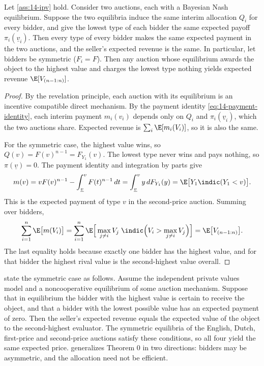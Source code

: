 \begin{proposition}\label{prop:14-ret}
Let \cref{ass:14-ipv} hold. Consider two auctions, each with a Bayesian Nash equilibrium. Suppose the two equilibria induce the same interim allocation $Q_i$ for every bidder, and give the lowest type of each bidder the same expected payoff $\pi_i(\underline v_i)$. Then every type of every bidder makes the same expected payment in the two auctions, and the seller's expected revenue is the same. In particular, let bidders be symmetric ($F_i=F$). Then any auction whose equilibrium awards the object to the highest value and charges the lowest type nothing yields expected revenue $\E[V_{(n-1:n)}]$.
\end{proposition}

\begin{proof}
By the revelation principle, each auction with its equilibrium is an incentive compatible direct mechanism. By the payment identity \eqref{eq:14-payment-identity}, each interim payment $m_i(v_i)$ depends only on $Q_i$ and $\pi_i(\underline v_i)$, which the two auctions share. Expected revenue is $\sum_i\E[m_i(V_i)]$, so it is also the same.

For the symmetric case, the highest value wins, so $Q(v)=F(v)^{n-1}=F_{Y_1}(v)$. The lowest type never wins and pays nothing, so $\pi(\underline v)=0$. The payment identity and integration by parts give
\[
m(v)=vF(v)^{n-1}-\int_{\underline v}^vF(t)^{n-1}\,dt=\int_{\underline v}^v y\,dF_{Y_1}(y)=\E\big[Y_1\indic(Y_1<v)\big].
\]
This is the expected payment of type $v$ in the second-price auction. Summing over bidders,
\[
\sum_{i=1}^n\E\big[m(V_i)\big]=\sum_{i=1}^n\E\Big[\max_{j\neq i}V_j\;\indic\Big(V_i>\max_{j\neq i}V_j\Big)\Big]=\E\big[V_{(n-1:n)}\big].
\]
The last equality holds because exactly one bidder has the highest value, and for that bidder the highest rival value is the second-highest value overall.
\end{proof}

 state the symmetric case as follows. Assume the independent private values model and a noncooperative equilibrium of some auction mechanism. Suppose that in equilibrium the bidder with the highest value is certain to receive the object, and that a bidder with the lowest possible value has an expected payment of zero. Then the seller's expected revenue equals the expected value of the object to the second-highest evaluator. The symmetric equilibria of the English, Dutch, first-price and second-price auctions satisfy these conditions, so all four yield the same expected price.  generalizes Theorem 0 in two directions: bidders may be asymmetric, and the allocation need not be efficient.

